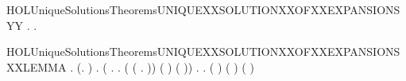 \newcommand{\HOLUniqueSolutionsTheoremsUNIQUEXXSOLUTIONXXOFXXEXPANSIONS}{\UseVerbatim{HOLUniqueSolutionsTheoremsUNIQUEXXSOLUTIONXXOFXXEXPANSIONS}}
\begin{SaveVerbatim}{HOLUniqueSolutionsTheoremsUNIQUEXXSOLUTIONXXOFXXEXPANSIONSYY}
\HOLTokenTurnstile{} \HOLSymConst{\HOLTokenForall{}}.
         \HOLSymConst{\HOLTokenImp{}}
       \HOLSymConst{\HOLTokenForall{}} .     \HOLSymConst{\HOLTokenConj{}}     \HOLSymConst{\HOLTokenImp{}}   
\end{SaveVerbatim}
\newcommand{\HOLUniqueSolutionsTheoremsUNIQUEXXSOLUTIONXXOFXXEXPANSIONSYY}{\UseVerbatim{HOLUniqueSolutionsTheoremsUNIQUEXXSOLUTIONXXOFXXEXPANSIONSYY}}
\begin{SaveVerbatim}{HOLUniqueSolutionsTheoremsUNIQUEXXSOLUTIONXXOFXXEXPANSIONSXXLEMMA}
\HOLTokenTurnstile{} \HOLSymConst{\HOLTokenForall{}} .
       (\HOLSymConst{\HOLTokenExists{}}.   \HOLSymConst{\HOLTokenConj{}}     \HOLSymConst{\HOLTokenConj{}}    ) \HOLSymConst{\HOLTokenImp{}}
       \HOLSymConst{\HOLTokenForall{}}.
             \HOLSymConst{\HOLTokenImp{}}
           (\HOLSymConst{\HOLTokenForall{}} .
                  \HOLTokenWeakTransBegin{} \HOLTokenWeakTransEnd {} \HOLSymConst{\HOLTokenImp{}}
                \HOLSymConst{\HOLTokenExists{}}.
                      \HOLSymConst{\HOLTokenConj{}}     \HOLSymConst{\HOLTokenConj{}}
                    (  (\HOLTokenLambda{} .  \HOLTokenWeakTransBegin{} \HOLTokenWeakTransEnd {})) ( )
                      ( )) \HOLSymConst{\HOLTokenConj{}}
           \HOLSymConst{\HOLTokenForall{}}.
                 \HOLTokenWeakTransBegin\HOLConst{\ensuremath{\tau}}\HOLTokenWeakTransEnd {} \HOLSymConst{\HOLTokenImp{}}
               \HOLSymConst{\HOLTokenExists{}}.
                     \HOLSymConst{\HOLTokenConj{}}     \HOLSymConst{\HOLTokenConj{}}
                   (  ) ( ) ( )
\end{SaveVerbatim}
